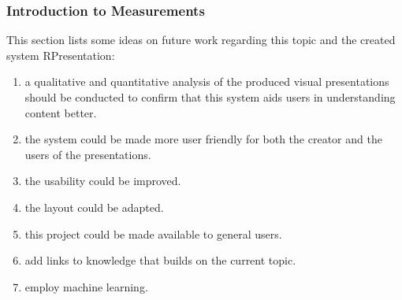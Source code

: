 \begin{frame}
  \frametitle{Introduction to Measurements}
  \begin{module}[id=intromeasurements]

This section lists some ideas on future work regarding this topic and the created system RPresentation:
\begin{enumerate}
 
 \item a qualitative and quantitative analysis of the produced visual presentations should be conducted to confirm that this system aids users in understanding content better.
 \item the system could be made more user friendly for both the creator and the users of the presentations.
 \item the usability could be improved.
 \item the layout could be adapted.
 \item this project could be made available to general users.
 \item add links to knowledge that builds on the current topic.
 \item employ machine learning.

\end{enumerate}
  \end{module}
\end{frame}